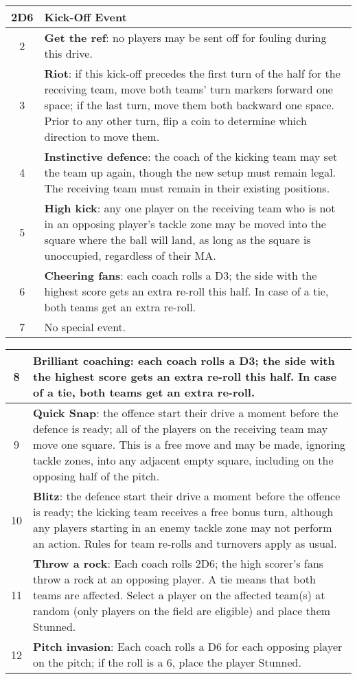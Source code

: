 \begin{multicols}{2}
\medskip
\begin{tabularx}{\linewidth}{ | c | X | }
\hline
\textbf{2D6} & \textbf{Kick-Off Event} \\ 
\hline
2 & \textbf{Get the ref}: no players may be sent off for fouling during this drive. \\
\hline
3 & \textbf{Riot}: if this kick-off precedes the first turn of the half for the receiving team, move both teams' turn markers forward one space; if the last turn, move them both backward one space. Prior to any other turn, flip a coin to determine which direction to move them. \\
\hline
4 & \textbf{Instinctive defence}: the coach of the kicking team may set the team up again, though the new setup must remain legal. The receiving team must remain in their existing positions. \\
\hline
5 & \textbf{High kick}: any one player on the receiving team who is not in an opposing player's tackle zone may be moved into the square where the ball will land, as long as the square is unoccupied, regardless of their MA. \\
\hline
6 & \textbf{Cheering fans}: each coach rolls a D3; the side with the highest score gets an extra re-roll this half. In case of a tie, both teams get an extra re-roll. \\
\hline
7 & No special event. \\
\hline
\end{tabularx}

\begin{tabularx}{\linewidth}{ | c | X | }
\hline
8 & \textbf{Brilliant coaching}: each coach rolls a D3; the side with the highest score gets an extra re-roll this half. In case of a tie, both teams get an extra re-roll. \\
\hline
9 & \textbf{Quick Snap}: the offence start their drive a moment before the defence is ready; all of the players on the receiving team may move one square. This is a free move and may be made, ignoring tackle zones, into any adjacent empty square, including on the opposing half of the pitch. \\
\hline
10 & \textbf{Blitz}: the defence start their drive a moment before the offence is ready; the kicking team receives a free bonus turn, although any players starting in an enemy tackle zone may not perform an action. Rules for team re-rolls and turnovers apply as usual. \\
\hline
11 & \textbf{Throw a rock}: Each coach rolls 2D6; the high scorer's fans throw a rock at an opposing player. A tie means that both teams are affected. Select a player on the affected team(s) at random (only players on the field are eligible) and place them Stunned. \\
\hline
12 & \textbf{Pitch invasion}: Each coach rolls a D6 for each opposing player on the pitch; if the roll is a 6, place the player Stunned. \\
\hline
\end{tabularx}
\medskip


\end{multicols}
